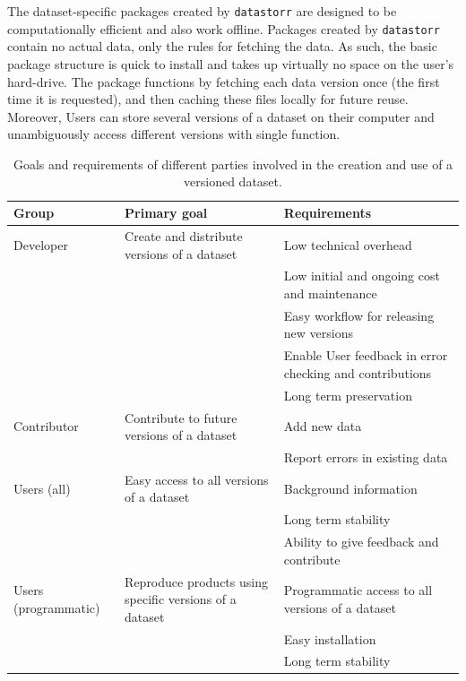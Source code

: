 \documentclass[a4paper,num-refs]{assets/oup-contemporary}
\begin{document}
The dataset-specific packages created by \texttt{datastorr} are designed to be computationally efficient and also work offline. Packages created by \texttt{datastorr} contain no actual data, only the rules for fetching the data. As such, the basic package structure is quick to install and takes up virtually no space on the user's hard-drive. The package functions by fetching each data version once (the first time it is requested), and then caching these files locally for future reuse. Moreover, Users can store several versions of a dataset on their computer and unambiguously access different versions with single function.

\begin{table}[t!]
\centering
\caption{Goals and requirements of different parties involved in the creation and use of a versioned dataset.}
\vspace{0.2cm}
  \begin{tabular}{p{3cm}p{7cm}p{6cm}}
  \hline
  \textbf{Group} & \textbf{Primary goal} & \textbf{Requirements} \\ \hline
  Developer & Create and distribute versions of a dataset & Low technical overhead \\
    & & Low initial and ongoing cost and maintenance \\
    & & Easy workflow for releasing new versions \\
    & & Enable User feedback in error checking and contributions \\
    & & Long term preservation \\
  Contributor & Contribute to future versions of a dataset & Add new data \\
    & & Report errors in existing data \\
  Users (all) & Easy access to all versions of a dataset & Background information\\
    & & Long term stability \\
    & & Ability to give feedback and contribute \\
  Users (programmatic) & Reproduce products using specific versions of a dataset & Programmatic access to all versions of a dataset \\
    & & Easy installation \\
    & & Long term stability \\
  \hline
  \end{tabular}
\label{tab:user_requirements}
\end{table}
\end{document}
